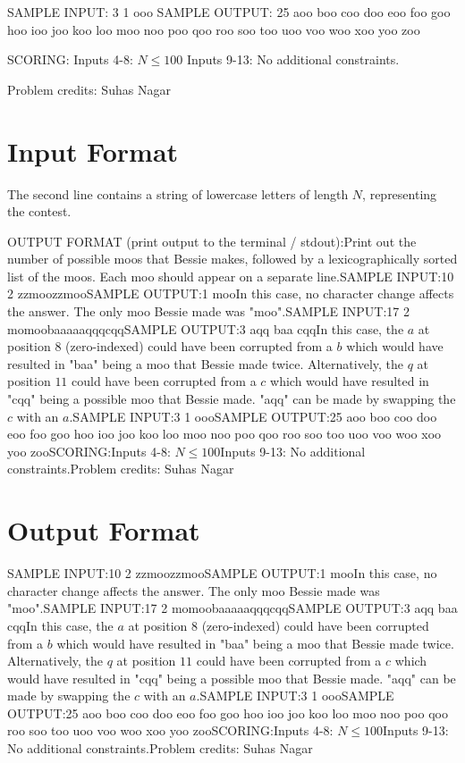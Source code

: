 \documentclass[12pt]{article}
\begin{document}
SAMPLE INPUT:
3 1
ooo
SAMPLE OUTPUT: 
25
aoo
boo
coo
doo
eoo
foo
goo
hoo
ioo
joo
koo
loo
moo
noo
poo
qoo
roo
soo
too
uoo
voo
woo
xoo
yoo
zoo

SCORING:
Inputs 4-8: $N \le 100$ Inputs 9-13: No additional constraints.



Problem credits: Suhas Nagar



\section*{Input Format}
The second line contains a string of lowercase letters of length $N$,
representing the contest.

OUTPUT FORMAT (print output to the terminal / stdout):Print out the number of possible moos that Bessie makes, followed by a
lexicographically sorted list of the moos. Each moo should appear on a separate
line.SAMPLE INPUT:10 2
zzmoozzmooSAMPLE OUTPUT:1
mooIn this case, no character change affects the answer. The only moo Bessie made
was "moo".SAMPLE INPUT:17 2
momoobaaaaaqqqcqqSAMPLE OUTPUT:3
aqq
baa
cqqIn this case, the $a$ at position $8$ (zero-indexed) could have been corrupted from a $b$ which
would have resulted in "baa" being a moo that Bessie made twice. Alternatively,
the $q$ at position $11$ could have been corrupted from a $c$ which would have
resulted in "cqq" being a possible moo that Bessie made. "aqq" can be made by
swapping the $c$ with an $a$.SAMPLE INPUT:3 1
oooSAMPLE OUTPUT:25
aoo
boo
coo
doo
eoo
foo
goo
hoo
ioo
joo
koo
loo
moo
noo
poo
qoo
roo
soo
too
uoo
voo
woo
xoo
yoo
zooSCORING:Inputs 4-8: $N \le 100$Inputs 9-13: No additional constraints.Problem credits: Suhas Nagar

\section*{Output Format}
SAMPLE INPUT:10 2
zzmoozzmooSAMPLE OUTPUT:1
mooIn this case, no character change affects the answer. The only moo Bessie made
was "moo".SAMPLE INPUT:17 2
momoobaaaaaqqqcqqSAMPLE OUTPUT:3
aqq
baa
cqqIn this case, the $a$ at position $8$ (zero-indexed) could have been corrupted from a $b$ which
would have resulted in "baa" being a moo that Bessie made twice. Alternatively,
the $q$ at position $11$ could have been corrupted from a $c$ which would have
resulted in "cqq" being a possible moo that Bessie made. "aqq" can be made by
swapping the $c$ with an $a$.SAMPLE INPUT:3 1
oooSAMPLE OUTPUT:25
aoo
boo
coo
doo
eoo
foo
goo
hoo
ioo
joo
koo
loo
moo
noo
poo
qoo
roo
soo
too
uoo
voo
woo
xoo
yoo
zooSCORING:Inputs 4-8: $N \le 100$Inputs 9-13: No additional constraints.Problem credits: Suhas Nagar
\end{document}

